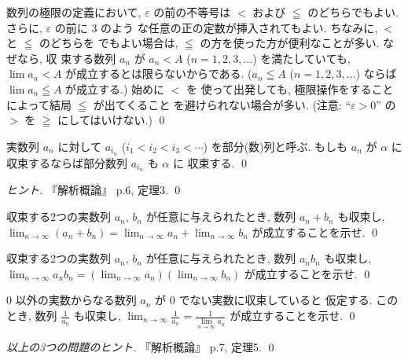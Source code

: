 \documentclass[12pt,twoside]{jarticle}
\begin{document}
\begin{rem}
 数列の極限の定義において, $\varepsilon$ の前の不等号は $<$ 
 および $\leqq$ のどちらでもよい. さらに, $\varepsilon$ の前に $3$ のよう
 な任意の正の定数が挿入されてもよい. ちなみに, $<$ と $\leqq$ のどちらを
 でもよい場合は, $\leqq$ の方を使った方が便利なことが多い.  なぜなら, 収
 束する数列 $a_n$ が $a_n < A$ ($n=1,2,3,\ldots$) を満たしていても, 
 $\lim a_n < A$ が成立するとは限らないからである. ($a_n\leqq A$
 ($n=1,2,3,\ldots$) ならば $\lim a_n \leqq A$ が成立する.) 始めに $<$ を
 使って出発しても, 極限操作をすることによって結局 $\leqq$ が出てくること
 を避けられない場合が多い.
 (注意: ``$\varepsilon > 0$'' の $>$ を $\geqq$ にしてはいけない.)
 \qed
\end{rem}

\begin{question}[収束数列の部分数列の極限]
 実数列 $a_n$ に対して $a_{i_n}$ ($i_1<i_2<i_3<\cdots$) を部分(数)列と呼ぶ.
 もしも $a_n$ が $\alpha$ に収束するならば部分数列 $a_{i_n}$ も $\alpha$ に
 収束する. \qed
\end{question}

\begin{proof}[ヒント]
 『解析概論』\cite{takagi} p.6, 定理3. \qed
\end{proof}

\begin{question}[極限と加法の可換性]
 収束する2つの実数列 $a_n$, $b_n$ が任意に与えられたとき, 
 数列 $a_n+b_n$ も収束し, 
 $\lim_{n\to\infty}(a_n+b_n)=\lim_{n\to\infty}a_n+\lim_{n\to\infty}b_n$
 が成立することを示せ.
 \qed
\end{question}

\begin{question}[極限と乗法の可換性]
 収束する2つの実数列 $a_n$, $b_n$ が任意に与えられたとき, 
 数列 $a_nb_n$ も収束し, %
 \(\lim_{n\to\infty} a_nb_n=
 \left(\lim_{n\to\infty}a_n\right)\left(\lim_{n\to\infty}b_n\right)\)
 が成立することを示せ.
 \qed
\end{question}

\begin{question}[極限と逆数を取る操作の可換性]
  $0$ 以外の実数からなる数列 $a_n$ が $0$ でない実数に収束していると
  仮定する. このとき, 数列 $\displaystyle\frac{1}{a_n}$ も収束し,
  \(\displaystyle
    \lim_{n\to\infty}\frac{1}{a_n}
    = \frac{1}{\lim\limits_{n\to\infty}a_n}
  \)
  が成立することを示せ.
  \qed
\end{question}

\begin{proof}[以上の3つの問題のヒント]
 『解析概論』\cite{takagi} p.7, 定理5. \qed
\end{proof}
\end{document}

